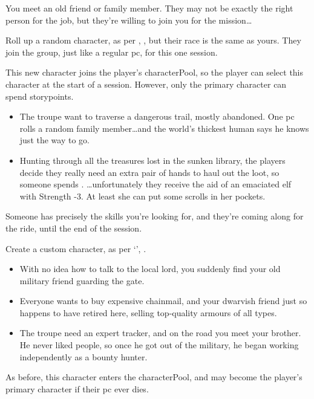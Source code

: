 \begin{multicols}{2}
\label{oldFriend}
You meet an old friend or family member.
They may not be exactly the right person for the job, but they're willing to join you for the mission\ldots

Roll up a random character, as per , , but their race is the same as yours.
They join the group, just like a regular \gls{pc}, for this one session.

This new character joins the player's \gls{characterPool}, so the player can select this character at the start of a session.
However, only the primary character can spend \glspl{storypoint}.

\begin{itemize}
  \item
  The troupe want to traverse a dangerous trail, mostly abandoned.
  One \gls{pc} rolls a random family member\ldots and the world's thickest human says he knows just the way to go.
  \item
  Hunting through all the treasures lost in the sunken library, the players decide they really need an extra pair of hands to haul out the loot, so someone spends .
  \ldots unfortunately they receive the aid of an emaciated elf with Strength -3.
  At least she can put some scrolls in her pockets.
\end{itemize}

Someone has precisely the skills you're looking for, and they're coming along for the ride, until the end of the session.

Create a custom character, as per `', .

\begin{itemize}
  \item
  With no idea how to talk to the local lord, you suddenly find your old military friend guarding the gate.
  \item
  Everyone wants to buy expensive chainmail, and your dwarvish friend just so happens to have retired here, selling top-quality armours of all types.
  \item
  The troupe need an expert tracker, and on the road you meet your brother.
  He never liked people, so once he got out of the military, he began working independently as a bounty hunter.
\end{itemize}

As before, this character enters the \gls{characterPool}, and may become the player's primary character if their \gls{pc} ever dies.


\end{multicols}
